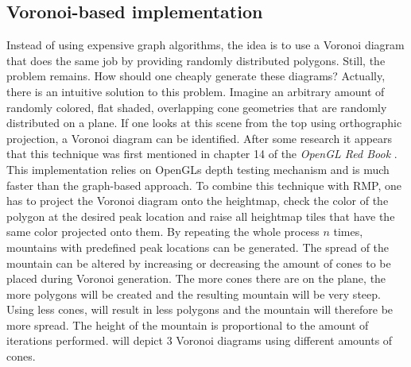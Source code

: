 \documentclass[11pt,a4paper,twoside,openright]{report}
\begin{document}
\subsection{Voronoi-based implementation}
\label{subsec:voronoibasedimpl}
Instead of using expensive graph algorithms, the idea is to use a Voronoi diagram that does the same job by providing randomly distributed polygons. Still, the problem remains. How should one cheaply generate these diagrams? Actually, there is an intuitive solution to this problem. Imagine an arbitrary amount of randomly colored, flat shaded, overlapping cone geometries that are randomly distributed on a plane. If one looks at this scene from the top using orthographic projection, a Voronoi diagram can be identified. After some research it appears that this technique was first mentioned in chapter 14 of the \emph{OpenGL Red Book} \cite{Woo:1999:OPG:554539}. This implementation relies on OpenGLs depth testing mechanism and is much faster than the graph-based approach. To combine this technique with RMP, one has to project the Voronoi diagram onto the heightmap, check the color of the polygon at the desired peak location and raise all heightmap tiles that have the same color projected onto them. By repeating the whole process $n$ times, mountains with predefined peak locations can be generated. The spread of the mountain can be altered by increasing or decreasing the amount of cones to be placed during Voronoi generation. The more cones there are on the plane, the more polygons will be created and the resulting mountain will be very steep. Using less cones, will result in less polygons and the mountain will therefore be more spread. The height of the mountain is proportional to the amount of iterations performed.  will depict 3 Voronoi diagrams using different amounts of cones.
\end{document}
